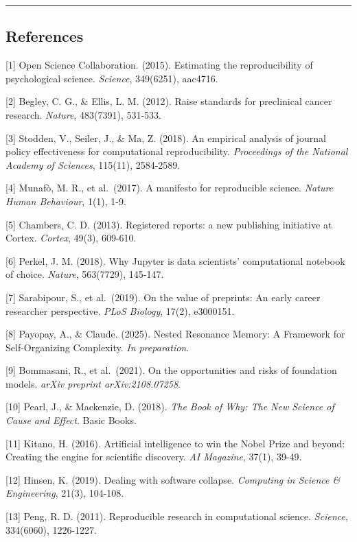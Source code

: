 \documentclass[
]{article}
\begin{document}
\begin{center}\rule{0.5\linewidth}{0.5pt}\end{center}

\subsection{References}\label{references}

{[}1{]} Open Science Collaboration. (2015). Estimating the
reproducibility of psychological science. \emph{Science}, 349(6251),
aac4716.

{[}2{]} Begley, C. G., \& Ellis, L. M. (2012). Raise standards for
preclinical cancer research. \emph{Nature}, 483(7391), 531-533.

{[}3{]} Stodden, V., Seiler, J., \& Ma, Z. (2018). An empirical analysis
of journal policy effectiveness for computational reproducibility.
\emph{Proceedings of the National Academy of Sciences}, 115(11),
2584-2589.

{[}4{]} Munafò, M. R., et al.~(2017). A manifesto for reproducible
science. \emph{Nature Human Behaviour}, 1(1), 1-9.

{[}5{]} Chambers, C. D. (2013). Registered reports: a new publishing
initiative at Cortex. \emph{Cortex}, 49(3), 609-610.

{[}6{]} Perkel, J. M. (2018). Why Jupyter is data scientists'
computational notebook of choice. \emph{Nature}, 563(7729), 145-147.

{[}7{]} Sarabipour, S., et al.~(2019). On the value of preprints: An
early career researcher perspective. \emph{PLoS Biology}, 17(2),
e3000151.

{[}8{]} Payopay, A., \& Claude. (2025). Nested Resonance Memory: A
Framework for Self-Organizing Complexity. \emph{In preparation}.

{[}9{]} Bommasani, R., et al.~(2021). On the opportunities and risks of
foundation models. \emph{arXiv preprint arXiv:2108.07258}.

{[}10{]} Pearl, J., \& Mackenzie, D. (2018). \emph{The Book of Why: The
New Science of Cause and Effect}. Basic Books.

{[}11{]} Kitano, H. (2016). Artificial intelligence to win the Nobel
Prize and beyond: Creating the engine for scientific discovery. \emph{AI
Magazine}, 37(1), 39-49.

{[}12{]} Hinsen, K. (2019). Dealing with software collapse.
\emph{Computing in Science \& Engineering}, 21(3), 104-108.

{[}13{]} Peng, R. D. (2011). Reproducible research in computational
science. \emph{Science}, 334(6060), 1226-1227.
\end{document}
